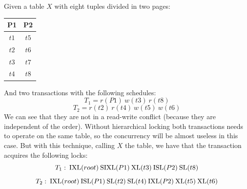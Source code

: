 \begin{itemize}
\begin{table}[H]
\begin{tabular}{ccccccc}
        \end{tabular}
    \end{table}
    \begin{example}
        Given a table $X$ with eight tuples divided in two pages: 
        \begin{table}[H]
            \centering
            \begin{tabular}{cc}
            \textbf{P1}                 & \textbf{P2}               \\ \hline
            \multicolumn{1}{|c|}{$t1$}  & \multicolumn{1}{c|}{$t5$} \\ 
            \multicolumn{1}{|c|}{$t2$}  & \multicolumn{1}{c|}{$t6$} \\ 
            \multicolumn{1}{|c|}{$t3$}  & \multicolumn{1}{c|}{$t7$} \\ 
            \multicolumn{1}{|c|}{$t4$}  & \multicolumn{1}{c|}{$t8$} \\ \hline
            \end{tabular}
        \end{table}
        And two transactions with the following schedules: 
        \[T_1=r(P1)\:w(t3)\:r(t8)\]
        \[T_2=r(t2)\:r(t4)\:w(t5)\:w(t6)\]
        We can see that they are not in a read-write conflict (because they are independent of the order). 
        Without hierarchical locking both transactions needs to operate on the same table, so the concurrency will be almost useless in this case. 
        But with this technique, calling $X$ the table, we have that the transaction acquires the following locks: 
        \[T_1:\:\textnormal{IXL}(root)\:\textnormal{SIXL}(P1)\:\textnormal{XL}(t3)\:\textnormal{ISL}(P2)\:\textnormal{SL}(t8)\]
        \[T_2:\:\textnormal{IXL}(root)\:\textnormal{ISL}(P1)\:\textnormal{SL}(t2)\:\textnormal{SL}(t4)\:\textnormal{IXL}(P2)\:\textnormal{XL}(t5)\:\textnormal{XL}(t6)\]
    \end{example}
\end{itemize}
